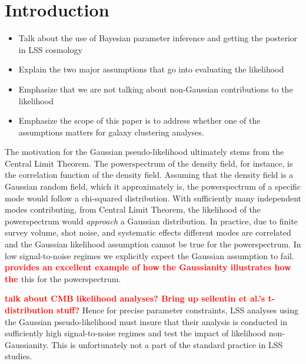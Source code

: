 \documentclass[12pt, letterpaper, preprint]{aastex}
\newcommand{\todo}[1]{{\bf \textcolor{red}{#1}}}
\begin{document}
\section{Introduction}


\begin{itemize}
    \item Talk about the use of Bayesian parameter inference and getting the posterior in LSS cosmology 
    \item Explain the two major assumptions that go into evaluating the likelihood
    \item Emphasize that we are not talking about non-Gaussian contributions to the likelihood
    \item Emphasize the scope of this paper is to address whether one of the assumptions matters for 
        galaxy clustering analyses. 
\end{itemize}

The motivation for the Gaussian pseudo-likelihood ultimately stems 
from the Central Limit Theorem. The powerspectrum of the density field, 
for instance, is the correlation function of the density field. Assuming 
that the density field is a Gaussian random field, which it approximately 
is, the powerspectrum of a specific mode would follow a chi-squared 
distribution. With sufficiently many independent modes contributing, 
from Central Limit Theorem, the likelihood of the powerspectrum would 
\emph{approach} a Gaussian distribution. In practice, due to finite 
survey volume, shot noise, and systematic effects different modes
are correlated and the Gaussian likelihood assumption cannot be true 
for the powerspectrum. In low signal-to-noise regimes we explicitly 
expect the Gaussian assumption to fail. \cite{scoccimarro2000} 
\todo{provides an excellent example of how the Gaussianity 
illustrates how the }
this for the powerspectrum. 

\todo{talk about CMB likelihood analyses? Bring up sellentin et al.'s t-distribution stuff?}
Hence for precise parameter constraints, LSS analyses using the Gaussian 
pseudo-likelihood must insure that their analysis is conducted in sufficiently high 
signal-to-noise regimes and test the impact of likelihood non-Gaussianity. 
This is unfortunately not a part of the standard practice in LSS studies. 
\end{document}
